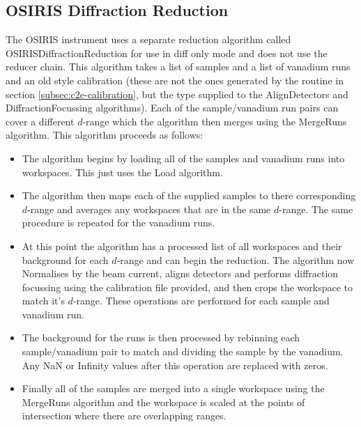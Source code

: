 \documentclass[paper=a4, fontsize=11pt]{scrartcl}	%
\numberwithin{equation}{section}															%
\numberwithin{figure}{section}																%
\numberwithin{table}{section}																%
\begin{document}
\subsection{OSIRIS Diffraction Reduction}
The OSIRIS instrument uses a separate reduction algorithm called OSIRISDiffractionReduction for use in diff only mode and does not use the reducer chain. This algorithm takes a list of samples and a list of vanadium runs and an old style calibration (these are not the ones generated by the routine in section \ref{subsec:c2e-calibration}, but the type supplied to the AlignDetectors and DiffractionFocussing algorithms). Each of the sample/vanadium run pairs can cover a different $d$-range which the algorithm then merges using the MergeRuns algorithm. This algorithm proceeds as follows:

\begin{itemize}
\item The algorithm begins by loading all of the samples and vanadium runs into workspaces. This just uses the Load algorithm.

\item The algorithm then maps each of the supplied samples to there corresponding $d$-range and averages any workspaces that are in the same $d$-range. The same procedure is repeated for the vanadium runs.

\item At this point the algorithm has a processed list of all workspaces and their background for each $d$-range and can begin the reduction. The algorithm now Normalises by the beam current, aligns detectors and performs diffraction focussing using the calibration file provided, and then crops the workspace to match it's $d$-range. These operations are performed for each sample and vanadium run.

\item The background for the runs is then processed by rebinning each sample/vanadium pair to match and dividing the sample by the vanadium. Any NaN or Infinity values after this operation are replaced with zeros.

\item Finally all of the samples are merged into a single workspace using the MergeRuns algorithm and the workspace is scaled at the points of intersection where there are overlapping ranges.
\end{itemize}
\end{document}
